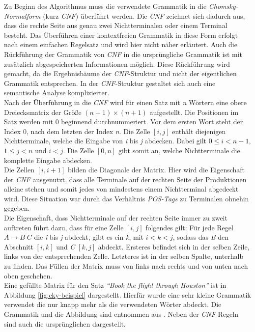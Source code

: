 Zu Beginn des Algorithmus muss die verwendete Grammatik in die \textit{Chomsky-Normalform} (kurz \textit{CNF}) überführt werden. Die \textit{CNF} zeichnet sich dadurch aus, dass die rechte Seite aus genau zwei Nichtterminalen oder einem Terminal besteht. Das Überführen einer kontextfreien Grammatik in diese Form erfolgt nach einem einfachen Regelsatz und wird hier nicht näher erläutert. Auch die Rückführung der Grammatik von \textit{CNF} in die ursprüngliche Grammatik ist mit zusätzlich abgespeicherten Informationen möglich. Diese Rückführung wird gemacht, da die Ergebnisbäume der \textit{CNF}-Struktur und nicht der eigentlichen Grammatik entsprechen. In der \textit{CNF}-Struktur gestaltet sich auch eine semantische Analyse komplizierter. \\
Nach der Überführung in die \textit{CNF} wird für einen Satz mit \textit{n} Wörtern eine obere Dreiecksmatrix der Größe \((n+1) \times (n+1) \) aufgestellt. Die Positionen im Satz werden mit 0 beginnend durchnummeriert. Vor dem ersten Wort steht der Index 0, nach dem letzten der Index \textit{n}. Die Zelle \([i, j]\) enthält diejenigen Nichtterminale, welche die Eingabe von \textit{i} bis \textit{j} abdecken. Dabei gilt \( 0 \leq i < n-1 \), \( 1 \leq j < n \) und \(i < j\). Die Zelle \([0, n]\) gibt somit an, welche Nichtterminale die komplette Eingabe abdecken.\\
Die Zellen \([i, i+1]\) bilden die Diagonale der Matrix. Hier wird die Eigenschaft der \textit{CNF} ausgenutzt, dass alle Terminale auf der rechten Seite der Produktionen alleine stehen und somit jedes von mindestens einem Nichtterminal abgedeckt wird. Diese Situation war durch das Verhältnis \textit{POS-Tags} zu Terminalen ohnehin gegeben.\\
Die Eigenschaft, dass Nichtterminale auf der rechten Seite immer zu zweit auftreten führt dazu, dass für eine Zelle \([i, j]\) folgendes gilt: Für jede Regel \( A \to B\;C \) die \textit{i} bis \textit{j} abdeckt, gibt es ein \textit{k}, mit \( i < k < j\), sodass das \textit{B} den Abschnitt \([i, k]\) und \textit{C} \([k, j]\) abdeckt. Ersteres befindet sich in der selben Zeile, links von der entsprechenden Zelle. Letzteres ist in der selben Spalte, unterhalb zu finden. Das Füllen der Matrix muss von links nach rechts und von unten nach oben geschehen.\\
Eine gefüllte Matrix für den Satz \textit{``Book the flight through Houston''} ist in Abbildung \ref{fig:cky-beispiel} dargestellt. Hierfür wurde eine sehr kleine Grammatik verwendet die nur knapp mehr als die verwendeten Wörter abdeckt. Die Grammatik und die Abbildung sind entnommen aus \cite[Kapitel 11]{nlpGrundlagen}. Neben der \textit{CNF} Regeln sind auch die ursprünglichen dargestellt.


